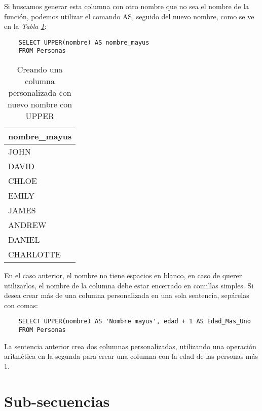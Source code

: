 Si buscamos generar esta columna con otro nombre que no sea el nombre de la función, podemos utilizar el comando AS, seguido del nuevo nombre, como se ve en la \textit{Tabla \ref{tab: 16}}:
\begin{lstlisting}
    SELECT UPPER(nombre) AS nombre_mayus
    FROM Personas
\end{lstlisting}
\begin{table}[H]
    \centering
    \caption{Creando una columna personalizada con nuevo nombre con UPPER}
    \label{tab: 16}
    \begin{tabular}{|l|}
        \hline
        \textbf{nombre\_mayus} \\
        \hline
        JOHN \\
        DAVID \\
        CHLOE \\
        EMILY \\
        JAMES \\
        ANDREW \\
        DANIEL \\
        CHARLOTTE \\
        \hline
    \end{tabular}
\end{table}

En el caso anterior, el nombre no tiene espacios en blanco, en caso de querer utilizarlos, el nombre de la columna debe estar encerrado en comillas simples. Si desea crear más de una columna personalizada en una sola sentencia, sepárelas con comas:
\begin{lstlisting}
    SELECT UPPER(nombre) AS 'Nombre mayus', edad + 1 AS Edad_Mas_Uno
    FROM Personas
\end{lstlisting}

La sentencia anterior crea dos columnas personalizadas, utilizando una operación aritmética en la segunda para crear una columna con la edad de las personas más 1.



\section{Sub-secuencias}

